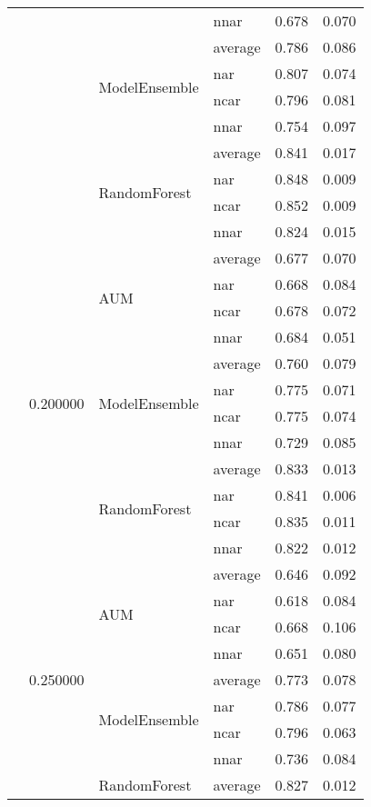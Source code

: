 \begin{longtable}{llllrr}
 &  &  & nnar & 0.678 & 0.070 \\
\cline{3-6}
 &  & \multirow[t]{4}{*}{ModelEnsemble} & average & 0.786 & 0.086 \\
 &  &  & nar & 0.807 & 0.074 \\
 &  &  & ncar & 0.796 & 0.081 \\
 &  &  & nnar & 0.754 & 0.097 \\
\cline{3-6}
 &  & \multirow[t]{4}{*}{RandomForest} & average & 0.841 & 0.017 \\
 &  &  & nar & 0.848 & 0.009 \\
 &  &  & ncar & 0.852 & 0.009 \\
 &  &  & nnar & 0.824 & 0.015 \\
\cline{2-6} \cline{3-6}
 & \multirow[t]{12}{*}{0.200000} & \multirow[t]{4}{*}{AUM} & average & 0.677 & 0.070 \\
 &  &  & nar & 0.668 & 0.084 \\
 &  &  & ncar & 0.678 & 0.072 \\
 &  &  & nnar & 0.684 & 0.051 \\
\cline{3-6}
 &  & \multirow[t]{4}{*}{ModelEnsemble} & average & 0.760 & 0.079 \\
 &  &  & nar & 0.775 & 0.071 \\
 &  &  & ncar & 0.775 & 0.074 \\
 &  &  & nnar & 0.729 & 0.085 \\
\cline{3-6}
 &  & \multirow[t]{4}{*}{RandomForest} & average & 0.833 & 0.013 \\
 &  &  & nar & 0.841 & 0.006 \\
 &  &  & ncar & 0.835 & 0.011 \\
 &  &  & nnar & 0.822 & 0.012 \\
\cline{2-6} \cline{3-6}
 & \multirow[t]{12}{*}{0.250000} & \multirow[t]{4}{*}{AUM} & average & 0.646 & 0.092 \\
 &  &  & nar & 0.618 & 0.084 \\
 &  &  & ncar & 0.668 & 0.106 \\
 &  &  & nnar & 0.651 & 0.080 \\
\cline{3-6}
 &  & \multirow[t]{4}{*}{ModelEnsemble} & average & 0.773 & 0.078 \\
 &  &  & nar & 0.786 & 0.077 \\
 &  &  & ncar & 0.796 & 0.063 \\
 &  &  & nnar & 0.736 & 0.084 \\
\cline{3-6}
 &  & \multirow[t]{4}{*}{RandomForest} & average & 0.827 & 0.012 \\

\end{longtable}
